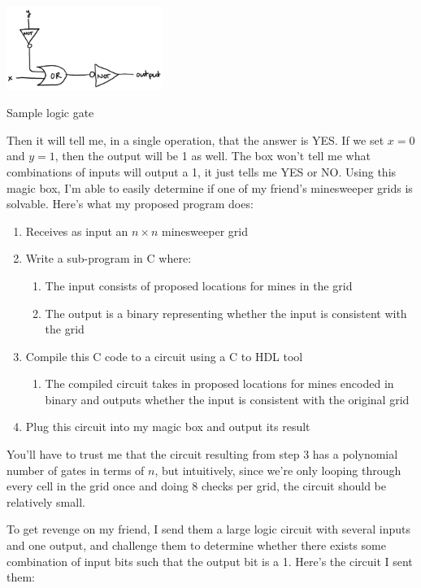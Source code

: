 \documentclass{article}
\begin{document}
\begin{center}
    \includegraphics[width=2in]{images/Minesweeper_fig2.png}
    
    \small{Sample logic gate}
\end{center}

Then it will tell me, in a single operation, that the answer is YES. If we set $x=0$ and $y=1$, then the output will be 1 as well. The box won’t tell me what combinations of inputs will output a 1, it just tells me YES or NO. Using this magic box, I’m able to easily determine if one of my friend’s minesweeper grids is solvable. Here’s what my proposed program does:
\begin{enumerate}
\item Receives as input an $n \times n$ minesweeper grid
\item Write a sub-program in C where:
    \begin{enumerate}
    \item The input consists of proposed locations for mines in the grid
    \item The output is a binary representing whether the input is consistent with the grid
    \end{enumerate}
\item Compile this C code to a circuit using a C to HDL tool
\begin{enumerate}
    \item The compiled circuit takes in proposed locations for mines encoded in binary and outputs whether the input is consistent with the original grid
\end{enumerate}
\item Plug this circuit into my magic box and output its result
\end{enumerate}

You’ll have to trust me that the circuit resulting from step 3 has a polynomial number of gates in terms of $n$, but intuitively, since we’re only looping through every cell in the grid once and doing 8 checks per grid, the circuit should be relatively small.



To get revenge on my friend, I send them a large logic circuit with several inputs and one output, and challenge them to determine whether there exists some combination of input bits such that the output bit is a 1. Here’s the circuit I sent them:
\end{document}
